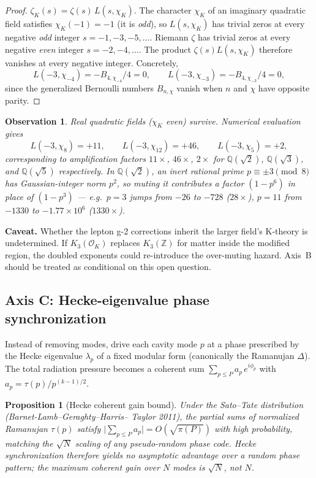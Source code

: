 \documentclass[11pt,a4paper]{article}
\newtheorem{observation}[theorem]{Observation}
\newtheorem{proposition}[theorem]{Proposition}
\begin{document}
\begin{proof}
$\zeta_K(s) = \zeta(s)\,L(s,\chi_K)$. The character $\chi_K$ of an
imaginary quadratic field satisfies $\chi_K(-1) = -1$ (it is
\emph{odd}), so $L(s,\chi_K)$ has trivial zeros at every negative
\emph{odd} integer $s = -1, -3, -5, \ldots$. Riemann $\zeta$ has
trivial zeros at every negative \emph{even} integer
$s = -2, -4, \ldots$. The product $\zeta(s)L(s,\chi_K)$ therefore
vanishes at every negative integer. Concretely,
\[
L(-3, \chi_{-4}) = -B_{4,\chi_{-4}}/4 = 0,\qquad
L(-3, \chi_{-3}) = -B_{4,\chi_{-3}}/4 = 0,
\]
since the generalized Bernoulli numbers $B_{n,\chi}$ vanish when
$n$ and $\chi$ have opposite parity.
\end{proof}

\begin{observation}
Real quadratic fields ($\chi_K$ even) survive. Numerical
evaluation gives
\[
L(-3, \chi_{8}) = +11,\qquad
L(-3, \chi_{12}) = +46,\qquad
L(-3, \chi_{5}) = +2,
\]
corresponding to amplification factors $11\times$, $46\times$,
$2\times$ for $\mathbb{Q}(\sqrt{2})$, $\mathbb{Q}(\sqrt{3})$, and
$\mathbb{Q}(\sqrt{5})$ respectively. In $\mathbb{Q}(\sqrt{2})$, an
inert rational prime $p\equiv\pm 3\pmod 8$ has Gaussian-integer
norm $p^2$, so muting it contributes a factor $(1-p^{6})$ in place
of $(1-p^{3})$ --- e.g.\ $p=3$ jumps from $-26$ to $-728$
($28\times$), $p=11$ from $-1330$ to $-1.77\times 10^{6}$
($1330\times$).
\end{observation}

\textbf{Caveat.} Whether the lepton g-2 corrections inherit the
larger field's K-theory is undetermined. If $K_3(\mathcal{O}_K)$
replaces $K_3(\mathbb{Z})$ for matter inside the modified region,
the doubled exponents could re-introduce the over-muting hazard.
Axis~B should be treated as conditional on this open question.

\subsection{Axis C: Hecke-eigenvalue phase synchronization}
\label{sec:axis_C}

Instead of removing modes, drive each cavity mode $p$ at a phase
prescribed by the Hecke eigenvalue $\lambda_p$ of a fixed modular
form (canonically the Ramanujan $\Delta$). The total radiation
pressure becomes a coherent sum
$\sum_{p \leq P} a_p\,e^{i\phi_p}$ with
$a_p = \tau(p)/p^{(k-1)/2}$.

\begin{proposition}[Hecke coherent gain bound]
\label{prop:hecke_bound}
Under the Sato--Tate distribution (Barnet-Lamb--Geraghty--Harris--%
Taylor 2011), the partial sums of normalized Ramanujan $\tau(p)$
satisfy
$\bigl|\sum_{p\leq P} a_p\bigr| = O(\sqrt{\pi(P)})$ with high
probability, matching the $\sqrt{N}$ scaling of any pseudo-random
phase code. Hecke synchronization therefore yields no asymptotic
advantage over a random phase pattern; the maximum coherent gain
over $N$ modes is $\sqrt{N}$, not $N$.
\end{proposition}
\end{document}
